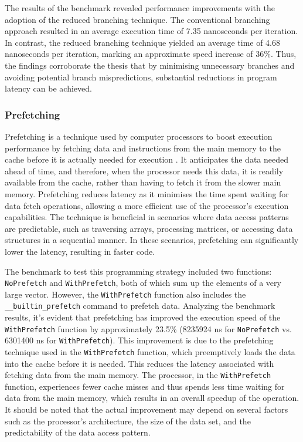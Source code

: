 \documentclass{article}
\theoremstyle{break}
\begin{document}
 The results of the benchmark revealed performance improvements with the adoption of the reduced branching technique. The conventional branching approach resulted in an average execution time of 7.35 nanoseconds per iteration. In contrast, the reduced branching technique yielded an average time of 4.68 nanoseconds per iteration, marking an approximate speed increase of 36\%. Thus, the findings corroborate the thesis that by minimising unnecessary branches and avoiding potential branch mispredictions, substantial reductions in program latency can be achieved.
 
\subsubsection*{Prefetching}
Prefetching is a technique used by computer processors to boost execution performance by fetching data and instructions from the main memory to the cache before it is actually needed for execution \cite{8, 14}. It anticipates the data needed ahead of time, and therefore, when the processor needs this data, it is readily available from the cache, rather than having to fetch it from the slower main memory. Prefetching reduces latency as it minimises the time spent waiting for data fetch operations, allowing a more efficient use of the processor's execution capabilities. The technique is beneficial in scenarios where data access patterns are predictable, such as traversing arrays, processing matrices, or accessing data structures in a sequential manner. In these scenarios, prefetching can significantly lower the latency, resulting in faster code.

The benchmark to test this programming strategy included two functions: \texttt{NoPrefetch} and \texttt{WithPrefetch}, both of which sum up the elements of a very large vector. However, the \texttt{WithPrefetch} function also includes the \texttt{\_\_builtin\_prefetch} command to prefetch data. Analyzing the benchmark results, it's evident that pre\-fetching has improved the execution speed of the \texttt{WithPrefetch} function by approximately 23.5\% (8235924 ns for \texttt{NoPrefetch} vs. 6301400 ns for \texttt{WithPrefetch}). This improvement is due to the prefetching technique used in the \texttt{WithPrefetch} function, which preemptively loads the data into the cache before it is needed. This reduces the latency associated with fetching data from the main memory. The processor, in the \texttt{WithPrefetch} function, experiences fewer cache misses and thus spends less time waiting for data from the main memory, which results in an overall speedup of the operation. It should be noted that the actual improvement may depend on several factors such as the processor's architecture, the size of the data set, and the predictability of the data access pattern.
\end{document}
